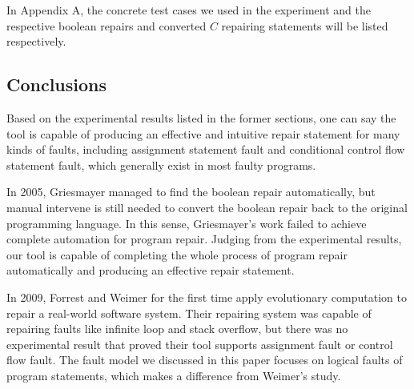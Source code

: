 In Appendix A, the concrete test cases we used in the experiment and the respective boolean repairs and converted $C$ repairing statements will be listed respectively.

\subsection{Conclusions}
Based on the experimental results listed in the former sections, one can say the tool is capable of producing an effective and intuitive repair statement for many kinds of faults, including assignment statement fault and conditional control flow statement fault, which generally exist in most faulty programs.

In 2005, Griesmayer managed to find the boolean repair automatically\cite{RoBPwaAtC}, but manual intervene is still needed to convert the boolean repair back to the original programming language. In this sense, Griesmayer's work failed to achieve complete automation for program repair.
Judging from the experimental results, our tool is capable of completing the whole process of program repair automatically and producing an effective repair statement.

In 2009,  Forrest and Weimer for the first time apply evolutionary computation to repair a real-world software system\cite{AFPUGP}. Their repairing system was capable of repairing faults like
infinite loop and stack overflow, but there was no experimental result that proved their tool supports assignment fault or control flow fault.
The fault model we discussed in this paper focuses on logical faults of program statements, which makes a difference from Weimer's study.

